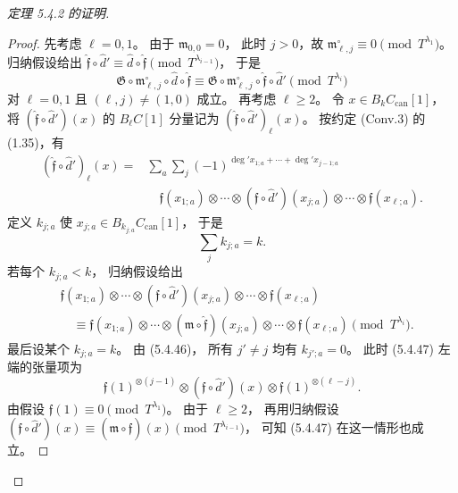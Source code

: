\begin{proof}[定理 5.4.2 的证明]
\begin{proof}
先考虑 $\ell=0,1$。
由于 $\mathfrak m_{0,0}=0$，
此时 $j>0$，故
$\mathfrak m^\circ_{\ell,j}
\equiv0\pmod{T^{\lambda_1}}$。
归纳假设给出
$\widehat{\mathfrak f}\circ\widehat d'
\equiv\widehat d\circ\widehat{\mathfrak f}
\pmod{T^{\lambda_{i-1}}}$，
于是
\begin{equation}
\mathfrak G\circ\mathfrak m^\circ_{\ell,j}
\circ\widehat d\circ\widehat{\mathfrak f}
\equiv
\mathfrak G\circ\mathfrak m^\circ_{\ell,j}
\circ\widehat{\mathfrak f}\circ\widehat d'
\pmod{T^{\lambda_i}}
\tag{5.4.44}\label{eq:5-4-44}
\end{equation}
对 $\ell=0,1$ 且 $(\ell,j)\ne(1,0)$ 成立。
再考虑 $\ell\geq2$。
令 $x\in B_kC_{\mathrm{can}}[1]$，
将 $(\widehat{\mathfrak f}\circ\widehat d')(x)$
的 $B_\ell C[1]$ 分量记为
$(\widehat{\mathfrak f}\circ\widehat d')_\ell(x)$。
按约定 (Conv.3) 的 (1.35)，有
\begin{equation}
\begin{aligned}
(\widehat{\mathfrak f}\circ\widehat d')_\ell(x)
={}&\sum_a\sum_j
(-1)^{\deg' x_{1;a}+\cdots+\deg' x_{j-1;a}}\\
&\quad\mathfrak f(x_{1;a})\otimes\cdots\otimes
(\mathfrak f\circ\widehat d')(x_{j;a})
\otimes\cdots\otimes\mathfrak f(x_{\ell;a}).
\end{aligned}
\tag{5.4.45}\label{eq:5-4-45}
\end{equation}
定义 $k_{j;a}$ 使
$x_{j;a}\in B_{k_{j;a}}C_{\mathrm{can}}[1]$，
于是
\begin{equation}
\sum_j k_{j;a}=k.
\tag{5.4.46}\label{eq:5-4-46}
\end{equation}
若每个 $k_{j;a}<k$，
归纳假设给出
\begin{equation}
\begin{aligned}
&\mathfrak f(x_{1;a})\otimes\cdots\otimes
(\mathfrak f\circ\widehat d')(x_{j;a})
\otimes\cdots\otimes\mathfrak f(x_{\ell;a})\\
&\quad\equiv
\mathfrak f(x_{1;a})\otimes\cdots\otimes
(\mathfrak m\circ\widehat{\mathfrak f})(x_{j;a})
\otimes\cdots\otimes\mathfrak f(x_{\ell;a})
\pmod{T^{\lambda_i}}.
\end{aligned}
\tag{5.4.47}\label{eq:5-4-47}
\end{equation}
最后设某个 $k_{j;a}=k$。
由 (5.4.46)，
所有 $j'\ne j$ 均有 $k_{j';a}=0$。
此时 (5.4.47) 左端的张量项为
\[
\mathfrak f(1)^{\otimes(j-1)}
\otimes(\mathfrak f\circ\widehat d')(x)
\otimes\mathfrak f(1)^{\otimes(\ell-j)}.
\]
由假设
$\mathfrak f(1)\equiv0\pmod{T^{\lambda_1}}$。
由于 $\ell\geq2$，
再用归纳假设
$(\mathfrak f\circ\widehat d')(x)
\equiv(\mathfrak m\circ\widehat{\mathfrak f})(x)
\pmod{T^{\lambda_{i-1}}}$，
可知 (5.4.47) 在这一情形也成立。


\end{proof}
\end{proof}
